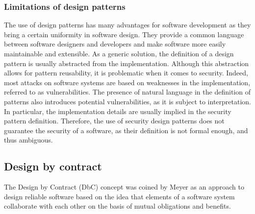 
\subsubsection{Limitations of design patterns}\label{PatternLimitations}

The use of design patterns has many advantages for software development as they bring a certain uniformity in software design. They provide a common language between software designers and developers and make software more easily maintainable and extensible. As a generic solution, the definition of a design pattern is usually abstracted from the implementation. Although this abstraction allows for pattern reusability, it is problematic when it comes to security. Indeed, most attacks on software systems are based on weaknesses in the implementation, referred to as vulnerabilities. The presence of natural language in the definition of patterns also introduces potential vulnerabilities, as it is subject to interpretation. In particular, the implementation details are usually implied in the security pattern definition. Therefore, the use of security design patterns does not guarantee the security of a software, as their definition is not formal enough, and thus ambiguous.

\subsection{Design by contract}

The Design by Contract (DbC) concept was coined by Meyer \cite{meyer1992applying} as an approach to design reliable software based on the idea that elements of a software system collaborate with each other on the basis of mutual obligations and benefits.

